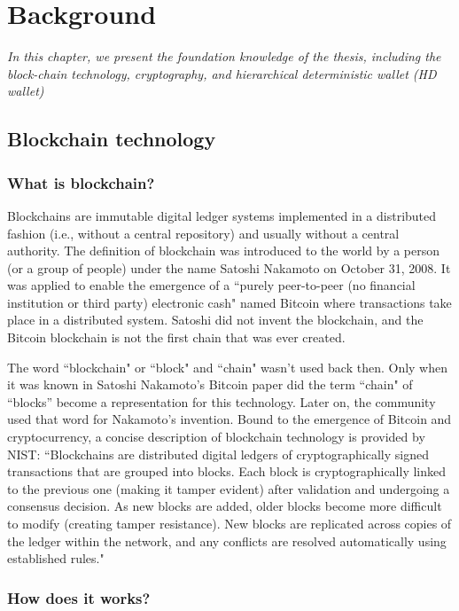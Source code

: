 \chapter{Background}
\label{chap:background}

\textit{In this chapter, we present the foundation knowledge of the thesis, including the block\hyp{}chain technology, cryptography, and hierarchical deterministic wallet (HD wallet)}

\minitoc

\section{Blockchain technology}
\label{blockchain}
\bigskip
\subsection{What is blockchain?}

Blockchains are immutable digital ledger systems implemented in a distributed fashion (i.e., without a central repository) and usually without a central authority. The definition of blockchain was introduced to the world by a person (or a group of people) under the name Satoshi Nakamoto on October 31, 2008. It was applied to enable the emergence of a ``purely peer-to-peer (no financial institution or third party) electronic cash" named Bitcoin where transactions take place in a distributed system. Satoshi did not invent the blockchain, and the Bitcoin blockchain is not the first chain that was ever created.

The word ``blockchain" or ``block" and ``chain" wasn't used back then. Only when it was known in Satoshi Nakamoto's Bitcoin paper did the term ``chain" of ``blocks” become a representation for this technology. Later on, the community used that word for Nakamoto's invention. Bound to the emergence of Bitcoin and cryptocurrency, a concise description of blockchain technology is provided by NIST: ``Blockchains are distributed digital ledgers of cryptographically signed transactions that are grouped into blocks. Each block is cryptographically linked to the previous one (making it tamper evident) after validation and undergoing a consensus decision. As new blocks are added, older blocks become more difficult to modify (creating tamper resistance). New blocks are replicated across copies of the ledger within the network, and any conflicts are resolved automatically using established rules."

\subsection{How does it works?}

